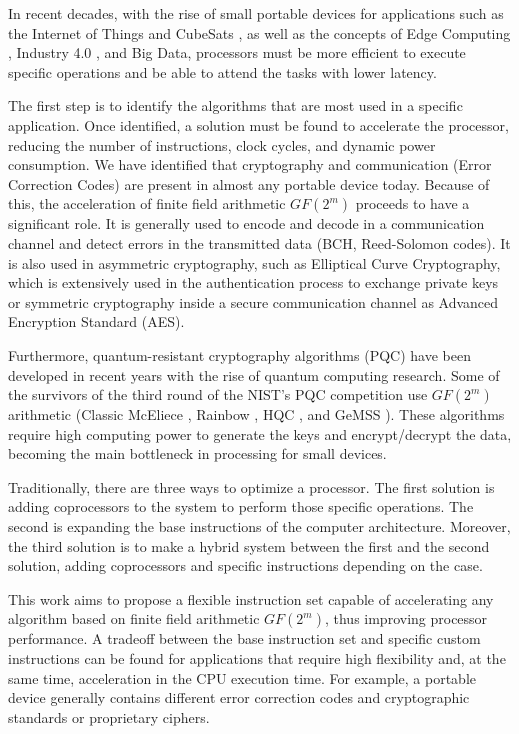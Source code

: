 In recent decades, with the rise of small portable devices for applications such as the Internet of Things \cite{5579543}
and CubeSats \cite{heidt2000cubesat}, as well as the concepts of Edge Computing \cite{7488250}, Industry 4.0 \cite{lasi2014industry}, 
and Big Data, processors must be more efficient to execute specific operations and be able to attend the tasks with lower latency.


The first step is to identify the algorithms that are most used in a specific application. 
Once identified, a solution must be found to accelerate the processor, reducing the number of instructions, 
clock cycles, and dynamic power consumption. We have identified that cryptography and communication 
(Error Correction Codes) are present in almost any portable device today. 
Because of this, the acceleration of finite field arithmetic $GF(2^m)$ proceeds to have a significant role. 
It is generally used to encode and decode in a communication channel and detect errors in the transmitted data 
(BCH, Reed-Solomon codes). It is also used in asymmetric cryptography, such as Elliptical Curve Cryptography, 
which is extensively used in the authentication process to exchange private keys or symmetric cryptography 
inside a secure communication channel as Advanced Encryption Standard (AES).


Furthermore, quantum-resistant cryptography algorithms (PQC) \cite{8791343} have been developed in recent years 
with the rise of quantum computing research. Some of the survivors of the third round of the NIST's PQC competition \cite{moody2016post} 
use $GF(2^m)$ arithmetic (Classic McEliece \cite{bernstein2017classic}, Rainbow \cite{10.1007/11496137_12}, HQC \cite{melchor2018hamming}, and GeMSS \cite{casanova2017gemss}). 
These algorithms require high computing power to generate the keys and encrypt/decrypt the data, 
becoming the main bottleneck in processing for small devices.


Traditionally, there are three ways to optimize a processor. The first solution is adding coprocessors 
to the system to perform those specific operations. The second is expanding the base instructions 
of the computer architecture. Moreover, the third solution is to make a hybrid system \cite{4352011} between the first and 
the second solution, adding coprocessors and specific instructions depending on the case. 


This work aims to propose a flexible instruction set 
capable of accelerating any algorithm based on finite field arithmetic $GF(2^m)$, thus improving processor performance. A tradeoff 
between the base instruction set and specific custom instructions can be found for applications that require high flexibility and, 
at the same time, acceleration in the CPU execution time. For example, a portable device generally contains different error correction codes 
and cryptographic standards or proprietary ciphers.



